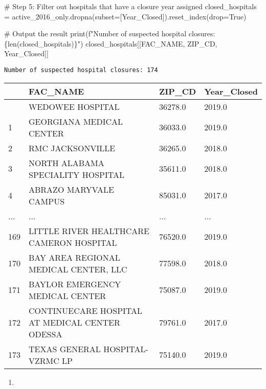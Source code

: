 \documentclass[
  letterpaper,
  DIV=11,
  numbers=noendperiod]{scrartcl}
\newenvironment{Shaded}{\begin{snugshade}}{\end{snugshade}}
\newcommand{\BuiltInTok}[1]{\textcolor[rgb]{0.00,0.23,0.31}{#1}}
\newcommand{\CommentTok}[1]{\textcolor[rgb]{0.37,0.37,0.37}{#1}}
\newcommand{\NormalTok}[1]{\textcolor[rgb]{0.00,0.23,0.31}{#1}}
\newcommand{\OperatorTok}[1]{\textcolor[rgb]{0.37,0.37,0.37}{#1}}
\newcommand{\SpecialCharTok}[1]{\textcolor[rgb]{0.37,0.37,0.37}{#1}}
\newcommand{\SpecialStringTok}[1]{\textcolor[rgb]{0.13,0.47,0.30}{#1}}
\newcommand{\StringTok}[1]{\textcolor[rgb]{0.13,0.47,0.30}{#1}}
\newcommand{\VariableTok}[1]{\textcolor[rgb]{0.07,0.07,0.07}{#1}}
\providecommand{\tightlist}{%
  \setlength{\itemsep}{0pt}\setlength{\parskip}{0pt}}\usepackage{longtable,booktabs,array}
\begin{document}
\begin{Shaded}
\begin{Highlighting}[]
\CommentTok{\# Step 5: Filter out hospitals that have a closure year assigned}
\NormalTok{closed\_hospitals }\OperatorTok{=}\NormalTok{ active\_2016\_only.dropna(subset}\OperatorTok{=}\NormalTok{[}\StringTok{\textquotesingle{}Year\_Closed\textquotesingle{}}\NormalTok{]).reset\_index(drop}\OperatorTok{=}\VariableTok{True}\NormalTok{)}

\CommentTok{\# Output the result}
\BuiltInTok{print}\NormalTok{(}\SpecialStringTok{f"Number of suspected hospital closures: }\SpecialCharTok{\{}\BuiltInTok{len}\NormalTok{(closed\_hospitals)}\SpecialCharTok{\}}\SpecialStringTok{"}\NormalTok{)}
\NormalTok{closed\_hospitals[[}\StringTok{\textquotesingle{}FAC\_NAME\textquotesingle{}}\NormalTok{, }\StringTok{\textquotesingle{}ZIP\_CD\textquotesingle{}}\NormalTok{, }\StringTok{\textquotesingle{}Year\_Closed\textquotesingle{}}\NormalTok{]]}
\end{Highlighting}
\end{Shaded}

\begin{verbatim}
Number of suspected hospital closures: 174
\end{verbatim}

\begin{longtable}[]{@{}llll@{}}
\toprule\noalign{}
& FAC\_NAME & ZIP\_CD & Year\_Closed \\
\midrule\noalign{}
\endhead
\bottomrule\noalign{}
\endlastfoot
0 & WEDOWEE HOSPITAL & 36278.0 & 2019.0 \\
1 & GEORGIANA MEDICAL CENTER & 36033.0 & 2019.0 \\
2 & RMC JACKSONVILLE & 36265.0 & 2018.0 \\
3 & NORTH ALABAMA SPECIALITY HOSPITAL & 35611.0 & 2018.0 \\
4 & ABRAZO MARYVALE CAMPUS & 85031.0 & 2017.0 \\
... & ... & ... & ... \\
169 & LITTLE RIVER HEALTHCARE CAMERON HOSPITAL & 76520.0 & 2019.0 \\
170 & BAY AREA REGIONAL MEDICAL CENTER, LLC & 77598.0 & 2018.0 \\
171 & BAYLOR EMERGENCY MEDICAL CENTER & 75087.0 & 2019.0 \\
172 & CONTINUECARE HOSPITAL AT MEDICAL CENTER ODESSA & 79761.0 &
2017.0 \\
173 & TEXAS GENERAL HOSPITAL- VZRMC LP & 75140.0 & 2019.0 \\
\end{longtable}

\begin{enumerate}
\def\labelenumi{\arabic{enumi}.}
\setcounter{enumi}{1}
\tightlist
\item
\end{enumerate}
\end{document}
